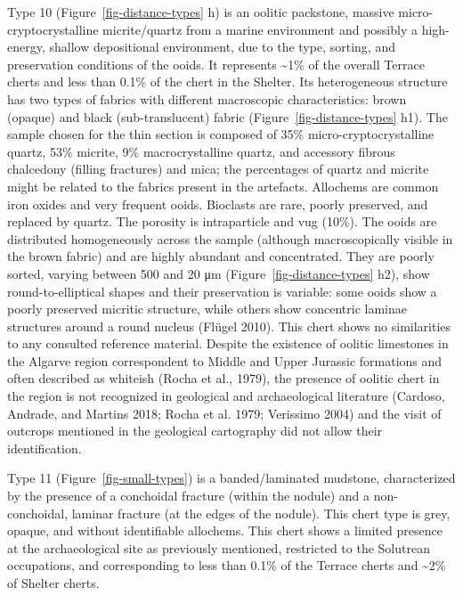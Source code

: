 \documentclass[
  a4paper,
  DIV=11,
  numbers=noendperiod]{scrreprt}
\begin{document}
Type 10 (Figure~\ref{fig-distance-types} h) is an oolitic packstone,
massive micro-cryptocrystalline micrite/quartz from a marine environment
and possibly a high-energy, shallow depositional environment, due to the
type, sorting, and preservation conditions of the ooids. It represents
\textasciitilde1\% of the overall Terrace cherts and less than 0.1\% of
the chert in the Shelter. Its heterogeneous structure has two types of
fabrics with different macroscopic characteristics: brown (opaque) and
black (sub-translucent) fabric (Figure~\ref{fig-distance-types} h1). The
sample chosen for the thin section is composed of 35\%
micro-cryptocrystalline quartz, 53\% micrite, 9\% macrocrystalline
quartz, and accessory fibrous chalcedony (filling fractures) and mica;
the percentages of quartz and micrite might be related to the fabrics
present in the artefacts. Allochems are common iron oxides and very
frequent ooids. Bioclasts are rare, poorly preserved, and replaced by
quartz. The porosity is intraparticle and vug (10\%). The ooids are
distributed homogeneously across the sample (although macroscopically
visible in the brown fabric) and are highly abundant and concentrated.
They are poorly sorted, varying between 500 and 20 μm
(Figure~\ref{fig-distance-types} h2), show round-to-elliptical shapes
and their preservation is variable: some ooids show a poorly preserved
micritic structure, while others show concentric laminae structures
around a round nucleus (Flügel 2010). This chert shows no similarities
to any consulted reference material. Despite the existence of oolitic
limestones in the Algarve region correspondent to Middle and Upper
Jurassic formations and often described as whiteish (Rocha et al.,
1979), the presence of oolitic chert in the region is not recognized in
geological and archaeological literature (Cardoso, Andrade, and Martins
2018; Rocha et al. 1979; Verissimo 2004) and the visit of outcrops
mentioned in the geological cartography did not allow their
identification.

Type 11 (Figure~\ref{fig-small-types}) is a banded/laminated mudstone,
characterized by the presence of a conchoidal fracture (within the
nodule) and a non-conchoidal, laminar fracture (at the edges of the
nodule). This chert type is grey, opaque, and without identifiable
allochems. This chert shows a limited presence at the archaeological
site as previously mentioned, restricted to the Solutrean occupations,
and corresponding to less than 0.1\% of the Terrace cherts and
\textasciitilde2\% of Shelter cherts.
\end{document}
